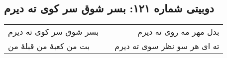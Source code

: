 \begin{center}
\section*{دوبیتی شماره ۱۲۱: بسر شوق سر کوی ته دیرم}
\label{sec:121}
\begin{longtable}{l p{0.5cm} r}
بسر شوق سر کوی ته دیرم
&&
بدل مهر مه روی ته دیرم
\\
بت من کعبهٔ من قبلهٔ من
&&
ته ای هر سو نظر سوی ته دیرم
\\
\end{longtable}
\end{center}
